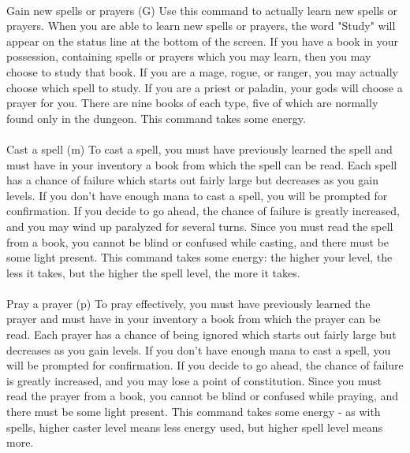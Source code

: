 \paragraph{}Gain new spells or prayers (G) Use this command to actually
learn new spells or prayers. When you are able to learn new spells or
prayers, the word "Study" will appear on the status line at the bottom
of the screen.  If you have a book in your possession, containing spells
or prayers which you may learn, then you may choose to study that book.
If you are a mage, rogue, or ranger, you may actually choose which spell
to study.  If you are a priest or paladin, your gods will choose a
prayer for you.  There are nine books of each type, five of which are
normally found only in the dungeon. This command takes some energy.

\paragraph{}Cast a spell (m) To cast a spell, you must have previously
learned the spell and must have in your inventory a book from which the
spell can be read. Each spell has a chance of failure which starts out
fairly large but decreases as you gain levels. If you don't have enough
mana to cast a spell, you will be prompted for confirmation. If you
decide to go ahead, the chance of failure is greatly increased, and you
may wind up paralyzed for several turns. Since you must read the spell
from a book, you cannot be blind or confused while casting, and there
must be some light present. This command takes some energy: the higher
your level, the less it takes, but the higher the spell level, the more
it takes.

\paragraph{}Pray a prayer (p) To pray effectively, you must have
previously learned the prayer and must have in your inventory a book
from which the prayer can be read. Each prayer has a chance of being
ignored which starts out fairly large but decreases as you gain levels.
If you don't have enough mana to cast a spell, you will be prompted for
confirmation. If you decide to go ahead, the chance of failure is
greatly increased, and you may lose a point of constitution.  Since you
must read the prayer from a book, you cannot be blind or confused while
praying, and there must be some light present.  This command takes some
energy - as with spells, higher caster level means less energy used, but
higher spell level means more.

